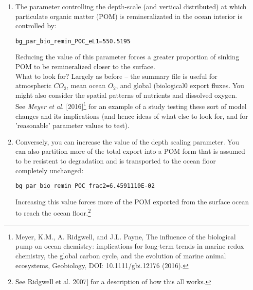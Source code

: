 \documentclass[11pt,fleqn]{book} %
\begin{document}
\begin{enumerate}[noitemsep]
\vspace{1mm}
\item The parameter controlling the depth-scale (and vertical distributed) at which particulate organic matter (POM) is remineralizated in the ocean interior is controlled by:
\vspace{-2pt}\begin{verbatim}
bg_par_bio_remin_POC_eL1=550.5195
\end{verbatim}\vspace{-2pt}
Reducing the value of this parameter forces a greater proportion of sinking POM to be remineralized closer to the surface.
\\What to look for? Largely as before -- the summary file is useful for atmospheric \(CO_{2}\), mean ocean {\(O_{2}\)}, and global (biological0 export fluxes. You might also consider the spatial patterns of nutrients and dissolved oxygen.
\\See \textit{Meyer et al.} [2016]\footnote{Meyer, K.M., A. Ridgwell, and J.L. Payne, The influence of the biological pump on ocean chemistry: implications for long-term trends in marine redox chemistry, the global carbon cycle, and the evolution of marine animal ecosystems, Geobiology, DOI: 10.1111/gbi.12176 (2016).} for an example of a study testing these sort of model changes and its implications (and hence ideas of what else to look for, and for 'reasonable' parameter values to test).

\vspace{1mm}
\item Conversely, you can increase the value of the depth scaling parameter. You can also partition more of the total export into a POM form that is assumed to be resistent to degradation and is transported to the ocean floor completely unchanged:
\vspace{-2pt}\begin{verbatim}
bg_par_bio_remin_POC_frac2=6.4591110E-02
\end{verbatim}\vspace{-2pt}
Increasing this value forces more of the POM exported from the surface ocean to reach the ocean floor.\footnote{See Ridgwell et al. 2007] for a description of how this all works.}


\end{enumerate}
\end{document}

